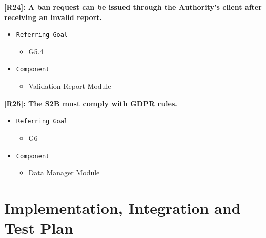 \documentclass[12pt,a4paper]{article}
\begin{document}
\textbf{[R24]: A ban request can be issued through the Authority's client after receiving an invalid report.}
\begin{itemize}
	\item \texttt{Referring Goal}
	\begin{itemize}
		\item G5.4
	\end{itemize}
	\item \texttt{Component}
	\begin{itemize}
		\item Validation Report Module 
	\end{itemize}
\end{itemize}
\textbf{[R25]: The S2B must comply with GDPR rules.}
\begin{itemize}
	\item \texttt{Referring Goal}
	\begin{itemize}
		\item G6
	\end{itemize}
	\item \texttt{Component}
	\begin{itemize}
		\item Data Manager Module 
	\end{itemize}
\end{itemize}
\section{Implementation, Integration and Test Plan}
\end{document}
